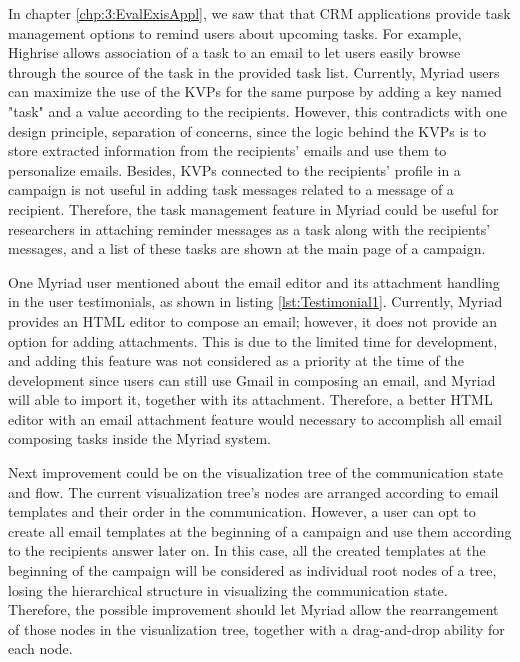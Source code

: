 In chapter \ref{chp:3:EvalExisAppl}, we saw that that \ac{CRM} applications provide task management options to remind users about upcoming tasks. For example, Highrise allows association of a task to an email to let users easily browse through the source of the task in the provided task list. Currently, Myriad users can maximize the use of the \ac{KVP}s for the same purpose by adding a key named "task" and a value according to the recipients. However, this contradicts with one design principle, separation of concerns, since the logic behind the \ac{KVP}s is to store extracted information from the recipients' emails and use them to personalize emails. Besides, \ac{KVP}s connected to the recipients' profile in a campaign is not useful in adding task messages related to a message of a recipient. Therefore, the task management feature in Myriad could be useful for researchers in attaching reminder messages as a task along with the recipients' messages, and a list of these tasks are shown at the main page of a campaign.
\vspace{1cm}

One Myriad user mentioned about the email editor and its attachment handling in the user testimonials, as shown in listing \ref{lst:Testimonial1}. Currently, Myriad provides an \ac{HTML} editor to compose an email; however, it does not provide an option for adding attachments. This is due to the limited time for development, and adding this feature was not considered as a priority at the time of the development since users can still use Gmail in composing an email, and Myriad will able to import it, together with its attachment. Therefore, a better \ac{HTML} editor with an email attachment feature would necessary to accomplish all email composing tasks inside the Myriad system.
\vspace{1cm}

Next improvement could be on the visualization tree of the communication state and flow. The current visualization tree's nodes are arranged according to email templates and their order in the communication. However, a user can opt to create all email templates at the beginning of a campaign and use them according to the recipients answer later on. In this case, all the created templates at the beginning of the campaign will be considered as individual root nodes of a tree, losing the hierarchical structure in visualizing the communication state. Therefore, the possible improvement should let Myriad allow the rearrangement of those nodes in the visualization tree, together with a drag-and-drop ability for each node.
\vspace{1cm}

